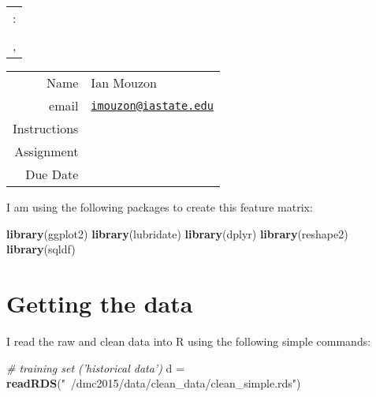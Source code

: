 \documentclass[10pt]{report}
\newenvironment{Shaded}{}{}
\newcommand{\KeywordTok}[1]{\textcolor[rgb]{0.00,0.44,0.13}{\textbf{{#1}}}}
\newcommand{\StringTok}[1]{\textcolor[rgb]{0.25,0.44,0.63}{{#1}}}
\newcommand{\CommentTok}[1]{\textcolor[rgb]{0.38,0.63,0.69}{\textit{{#1}}}}
\newcommand{\NormalTok}[1]{{#1}}
\begin{document}
\thispagestyle{empty}%
\begin{center}%
    \renewcommand{\arraystretch}{1.5}%
    \begin{tabular}{c}%
       \Large{: }\\
       \\
       , \\
    \end{tabular}
\end{center}

\begin{center}
 \renewcommand{\arraystretch}{1.5}
 \begin{tabular*}{0.65\textwidth}{r@{:\hspace{.3cm}}l}
    \hline
    Name& Ian Mouzon\\
    email& \href{mailto:imouzon@iastate.edu}{\nolinkurl{imouzon@iastate.edu}}\\
    Instructions& \\
    Assignment& \\
    Due Date&  \\
    \hline
 \end{tabular*}
\end{center}

I am using the following packages to create this feature matrix:

\begin{Shaded}
\begin{Highlighting}[]
\KeywordTok{library}\NormalTok{(ggplot2)}
\KeywordTok{library}\NormalTok{(lubridate)}
\KeywordTok{library}\NormalTok{(dplyr)}
\KeywordTok{library}\NormalTok{(reshape2)}
\KeywordTok{library}\NormalTok{(sqldf)}
\end{Highlighting}
\end{Shaded}

\section{Getting the data}\label{getting-the-data}

I read the raw and clean data into R using the following simple
commands:

\begin{Shaded}
\begin{Highlighting}[]
\CommentTok{# training set ('historical data')}
\NormalTok{d =}\StringTok{ }\KeywordTok{readRDS}\NormalTok{(}\StringTok{"~/dmc2015/data/clean_data/clean_simple.rds"}\NormalTok{)}
\end{Highlighting}
\end{Shaded}
\end{document}

